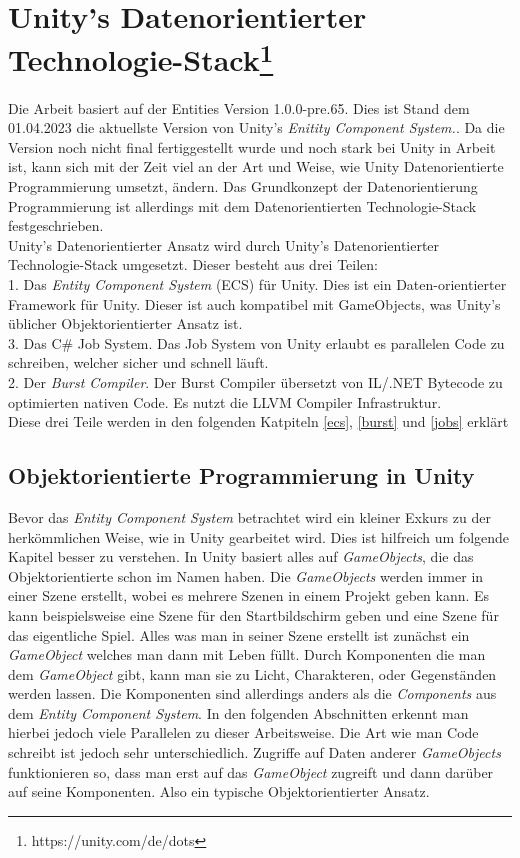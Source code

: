 \section{Unity's Datenorientierter Technologie-Stack\footnote{https://unity.com/de/dots}}
Die Arbeit basiert auf der Entities Version 1.0.0-pre.65. Dies ist Stand dem 01.04.2023 die aktuellste Version von Unity's \textit{Enitity Component System.}. Da die Version noch nicht final fertiggestellt wurde und noch stark bei Unity in Arbeit ist, kann sich mit der Zeit viel an der Art und Weise, wie Unity Datenorientierte Programmierung umsetzt, ändern. Das Grundkonzept der Datenorientierung Programmierung ist allerdings mit dem Datenorientierten Technologie-Stack festgeschrieben.\\
Unity's Datenorientierter Ansatz wird durch Unity's Datenorientierter Technologie-Stack umgesetzt. Dieser besteht aus drei Teilen:\\
1. Das \textit{Entity Component System} (ECS) für Unity. Dies ist ein Daten-orientierter Framework für Unity. Dieser ist auch kompatibel mit GameObjects, was Unity's üblicher Objektorientierter Ansatz ist.\\
3. Das C\# Job System. Das Job System von Unity erlaubt es parallelen Code zu schreiben, welcher sicher und schnell läuft.\\
2. Der \textit{Burst Compiler}. Der Burst Compiler übersetzt von IL/.NET Bytecode zu optimierten nativen Code. Es nutzt die LLVM Compiler Infrastruktur.\\
Diese drei Teile werden in den folgenden Katpiteln \ref{ecs}, \ref{burst} und \ref{jobs} erklärt
\subsection{Objektorientierte Programmierung in Unity}
Bevor das \textit{Entity Component System} betrachtet wird ein kleiner Exkurs zu der herkömmlichen Weise, wie in Unity gearbeitet wird. Dies ist hilfreich um folgende Kapitel besser zu verstehen. In Unity basiert alles auf \textit{GameObjects}, die das Objektorientierte schon im Namen haben. Die \textit{GameObjects} werden immer in einer Szene erstellt, wobei es mehrere Szenen in einem Projekt geben kann. Es kann beispielsweise eine Szene für den Startbildschirm geben und eine Szene für das eigentliche Spiel. Alles was man in seiner Szene erstellt ist zunächst ein \textit{GameObject} welches man dann mit Leben füllt. Durch Komponenten die man dem \textit{GameObject} gibt, kann man sie zu Licht, Charakteren, oder Gegenständen werden lassen. Die Komponenten sind allerdings anders als die \textit{Components} aus dem \textit{Entity Component System}. In den folgenden Abschnitten erkennt man hierbei jedoch viele Parallelen zu dieser Arbeitsweise. Die Art wie man Code schreibt ist jedoch sehr unterschiedlich. Zugriffe auf Daten anderer \textit{GameObjects} funktionieren so, dass man erst auf das \textit{GameObject} zugreift und dann darüber auf seine Komponenten. Also ein typische Objektorientierter Ansatz.


